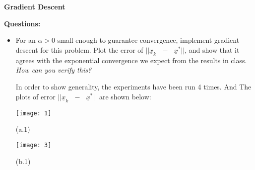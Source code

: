 \documentclass[11pt,letterpaper]{article}
\begin{document}
\bigskip
\textbf{Gradient Descent}
\begin{tcolorbox}
    \textbf{Questions:}
    \begin{itemize}
        \item For an $\alpha > 0$ small enough to guarantee convergence, implement gradient descent for this problem. Plot the error of 
        ${||}\underline x_k \text{ $-$ } \underline x^{*} {||}$, and show that it agrees with the exponential convergence we expect from the results in class. 
        \textit{How can you verify this?}
        \\
        \begin{flushleft}
            \justifying
            In order to show generality, the experiments have been run 4 times.
            And The plots of error ${||}\underline x_k \text{ $-$ } \underline x^{*} {||}$ are shown below:
        \end{flushleft}
        \begin{minipage}{0.4\textwidth}
            \texttt{[image: 1]}
            \begin{center}
                (a.1)
            \end{center}
        \end{minipage}
        \begin{minipage}{0.1\textwidth}
            \begin{center}
                
            \end{center}
        \end{minipage}
        \begin{minipage}{0.4\textwidth}
                \texttt{[image: 3]}
                \begin{center}
                (b.1)
                \end{center}
        \end{minipage}
    \end{itemize}
\end{tcolorbox}
\end{document}
